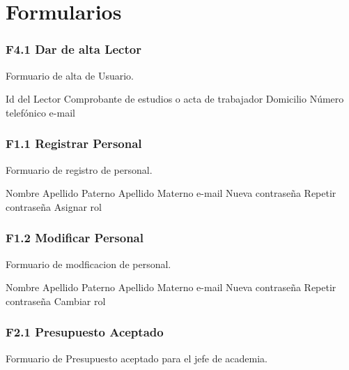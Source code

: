 \chapter{Formularios}
\label{appendix:Formularios}

\subsection{F4.1 Dar de alta Lector }
  Formuario de alta de Usuario.\\

	\begin{UClist}
      \UCli Id del Lector
      \UCli Comprobante de estudios o acta de trabajador
      \UCli Domicilio
      \UCli Número telefónico
      \UCli e-mail
    \end{UClist}

\subsection{F1.1 Registrar Personal }
  Formuario de registro de personal.\\

  \begin{UClist}
      \UCli Nombre
      \UCli Apellido Paterno
      \UCli Apellido Materno
      \UCli e-mail
      \UCli Nueva contraseña
      \UCli Repetir contraseña
      \UCli Asignar rol 
    \end{UClist}

\subsection{F1.2 Modificar Personal }
  Formuario de modficacion de personal.\\

  \begin{UClist}
      \UCli Nombre
      \UCli Apellido Paterno
      \UCli Apellido Materno
      \UCli e-mail
      \UCli Nueva contraseña
      \UCli Repetir contraseña
      \UCli Cambiar rol 
    \end{UClist}


\subsection{F2.1 Presupuesto Aceptado}
Formuario de Presupuesto aceptado para el jefe de academia.\\


